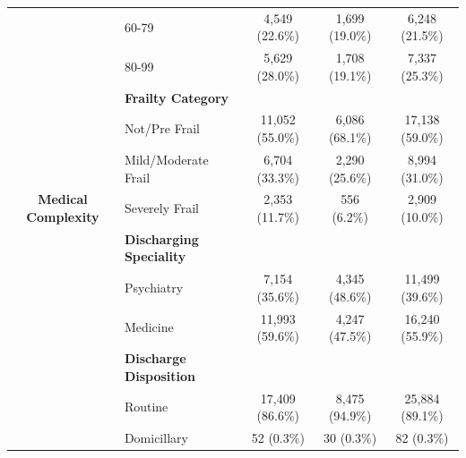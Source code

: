 \documentclass[useAMS,referee, usegraphicx]{biom}
\begin{document}
\begin{table}[H]
\begin{tabular}{clccc}
                                                    & { 60-79}                                   & { 4,549 (22.6\%)}  & { 1,699 (19.0\%)} & { 6,248 (21.5\%)}   \\
                                                    & { 80-99}                                   & { 5,629 (28.0\%)}  & { 1,708 (19.1\%)} & { 7,337 (25.3\%)}   \\
                                                    & { \textbf{Frailty Category}}               &                                                      &                                                     &                                                       \\
                                                    & { Not/Pre Frail}                           & { 11,052 (55.0\%)} & { 6,086 (68.1\%)} & { 17,138 (59.0\%)}  \\
                                                    & { Mild/Moderate Frail}                     & { 6,704 (33.3\%)}  & { 2,290 (25.6\%)} & { 8,994 (31.0\%)}   \\
\multirow{-11}{*}{\textbf{Medical Complexity}}      & { Severely Frail}                          & { 2,353 (11.7\%)}  & { 556 (6.2\%)}    & { 2,909 (10.0\%)}   \\ \midrule
                                                    & { \textbf{Discharging Speciality}}         &                                                      &                                                     &                                                       \\
                                                    & { Psychiatry}                              & { 7,154 (35.6\%)}  & { 4,345 (48.6\%)} & { 11,499 (39.6\%)}  \\
                                                    & { Medicine}                                & { 11,993 (59.6\%)} & { 4,247 (47.5\%)} & { 16,240 (55.9\%)}  \\
                                                    & { \textbf{Discharge Disposition}}          &                                                      &                                                     &                                                       \\
                                                    & { Routine}                                 & { 17,409 (86.6\%)} & { 8,475 (94.9\%)} & { 25,884 (89.1\%)}  \\
                                                    & { Domicillary}                             & { 52 (0.3\%)}      & { 30 (0.3\%)}     & { 82 (0.3\%)}       \\

\end{tabular}
\end{table}
\end{document}
